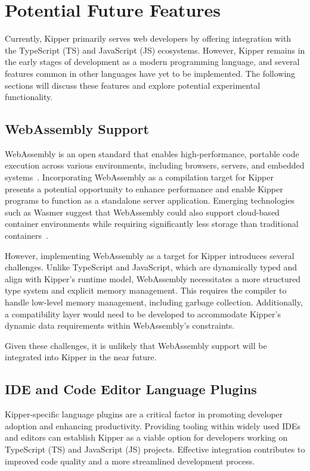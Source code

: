 \section{Potential Future Features}

Currently, Kipper primarily serves web developers by offering integration with the TypeScript (TS) and JavaScript (JS) ecosystems. However, Kipper remains in the early stages of development as a modern programming language, and several features common in other languages have yet to be implemented. The following sections will discuss these features and explore potential experimental functionality.

\subsection{WebAssembly Support}

WebAssembly is an open standard that enables high-performance, portable code execution across various environments, including browsers, servers, and embedded systems~\cite{webassembly}. Incorporating WebAssembly as a compilation target for Kipper presents a potential opportunity to enhance performance and enable Kipper programs to function as a standalone server application. Emerging technologies such as Wasmer suggest that WebAssembly could also support cloud-based container environments while requiring significantly less storage than traditional containers~\cite{wasmer}.

However, implementing WebAssembly as a target for Kipper introduces several challenges. Unlike TypeScript and JavaScript, which are dynamically typed and align with Kipper’s runtime model, WebAssembly necessitates a more structured type system and explicit memory management. This requires the compiler to handle low-level memory management, including garbage collection. Additionally, a compatibility layer would need to be developed to accommodate Kipper’s dynamic data requirements within WebAssembly’s constraints.

Given these challenges, it is unlikely that WebAssembly support will be integrated into Kipper in the near future.

\subsection{IDE and Code Editor Language Plugins}

Kipper-specific language plugins are a critical factor in promoting developer adoption and enhancing productivity. Providing tooling within widely used IDEs and editors can establish Kipper as a viable option for developers working on TypeScript (TS) and JavaScript (JS) projects. Effective integration contributes to improved code quality and a more streamlined development process.

